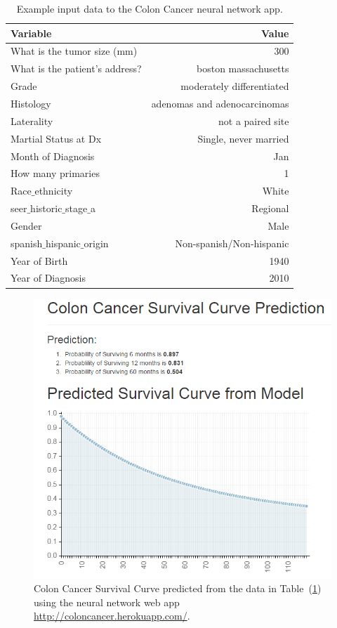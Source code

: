 \documentclass[a4paper,11pt]{article}
\begin{document}
\begin{table}[H]
\begin{center}
\begin{tabular}{lr}
\toprule
  Variable  & Value \\ 
\midrule
  What is the tumor size (mm) & 300 \\  
  What is the patient's address? & boston massachusetts \\ 
  Grade & moderately differentiated \\  
  Histology & adenomas and adenocarcinomas \\ 
  Laterality & not a paired site \\  
 Martial Status at Dx & Single, never married \\  
 Month of Diagnosis & Jan \\  
 How many primaries & 1 \\  
  Race$\_$ethnicity & White \\  
  seer$\_$historic$\_$stage$\_$a  & Regional \\ 
  Gender & Male \\  
  spanish$\_$hispanic$\_$origin & Non-spanish/Non-hispanic \\ 
 Year of Birth & 1940 \\  
  Year of Diagnosis & 2010 \\
\bottomrule
\end{tabular}
\caption{Example input data to the Colon Cancer neural network app.}
\label{tab:boston1940}
\end{center}
\end{table}



\begin{figure}[!ht]
  \centering
    \includegraphics[scale=.8]{boston1940}
\caption{\label{fig:boston1940} Colon Cancer Survival Curve predicted from the data in 
Table~(\ref{tab:boston1940}) using the neural network web app \url{http://coloncancer.herokuapp.com/}.}
\end{figure}
\end{document}
